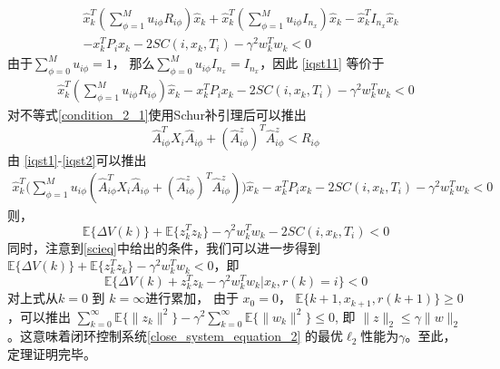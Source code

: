 	\begin{equation} \label{iqst11}
	\begin{split}
	&\hat{x}^{T}_{k}(\sum_{\phi=1}^{M}u_{i\phi}R_{i\phi})\hat{x}_k+ \hat{x}^{T}_{k}(\sum_{\phi=1}^{M}u_{i\phi}I_{n_{x}})\hat{x}_{k}-\hat{x}^{T}_{k}I_{n_{x}}\hat{x}_{k}\\
	&-x^{T}_{k}P_{i}x_{k}-2SC(i,x_k,T_i)-\gamma^{2}w^{T}_{k}w_{k}<0
	\end{split}
	\end{equation}
	由于$\sum_{\phi=0}^{M}u_{i\phi}=1$， 那么$\sum_{\phi=0}^{M}u_{i\phi}I_{n_x}=I_{n_x}$，因此 \eqref{iqst11} 等价于
	\begin{equation} \label{iqst1}
	\begin{split}
	\hat{x}^{T}_{k}(\sum_{\phi=1}^{M}u_{i\phi}R_{i\phi})\hat{x}_k-x^{T}_{k}P_{i}x_{k}-2SC(i,x_k,T_i)-\gamma^{2}w^{T}_{k}w_{k}<0
	\end{split}
	\end{equation}
	对不等式\eqref{condition_2_1}使用Schur补引理后可以推出
	\begin{equation} \label{iqst2}
	\hat{A}^{T}_{i\phi}X_{i}\hat{A}_{i\phi}+(\hat{A}^{z}_{i\phi})^{T}\hat{A}^{z}_{i\phi}<R_{i\phi}
	\end{equation}
	由 \eqref{iqst1}-\eqref{iqst2}可以推出
	\begin{equation} \label{leq222}
	\begin{split}
	\hat{x}^{T}_{k}\Big(\sum_{\phi=1}^{M}u_{i\phi}(\hat{A}^{T}_{i\phi}X_{i}\hat{A}_{i\phi}+(\hat{A}^{z}_{i\phi})^{T}\hat{A}^{z}_{i\phi})\Big)\hat{x}_k-x^{T}_{k}P_{i}x_{k}  -2SC(i,x_k,T_i)-\gamma^{2}w^{T}_{k}w_{k}<0
	\end{split}
	\end{equation}
	则， 
	\begin{equation} \label{eq31}
	\mathbb{E}\{\varDelta V(k)\}+\mathbb{E}\{z^{T}_{k}z_{k}\}-\gamma^{2}w^{T}_{k}w_{k}-2SC(i,x_k,T_i)<0
	\end{equation}
	同时，注意到\eqref{scieq}中给出的条件，我们可以进一步得到$\mathbb{E}\{\varDelta V(k)\}+\mathbb{E}\{z^{T}_{k}z_{k}\}-\gamma^{2}w^{T}_{k}w_{k}<0$，即
	\begin{equation}
	\mathbb{E}\{\varDelta V(k)+z^{T}_{k}z_{k}-\gamma^{2}w^{T}_{k}w_{k}|x_{k},r(k)=i \}<0
	\end{equation}
	对上式从$k=0$ 到 $k=\infty$进行累加， 由于 $x_{0} =0$， $\mathbb{E}\{k+1,x_{k+1},r(k+1)\}\geq0 $，可以推出 $\sum_{k=0}^{\infty}\mathbb{E}\{ \|z_{k}\|^{2} \}-\gamma^{2}\sum_{k=0}^{\infty}\mathbb{E}\{\|w_{k}\|^{2}\}\leq0 $, 即 $\|z\|_{2}\leq\gamma\|w\|_{2}$。这意味着闭环控制系统\eqref{close_system_equation_2} 的最优$\ell_2$性能为$\gamma$。至此，定理证明完毕。
	
